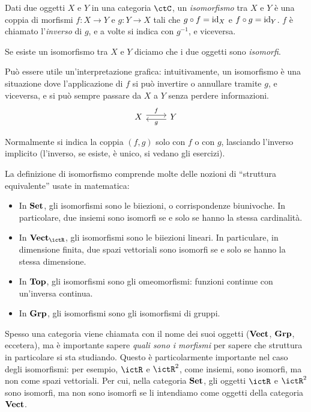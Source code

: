 \begin{definition}
 Dati due oggetti $X$ e $Y$ in una categoria $\ctC$, un \emph{isomorfismo} tra $X$ e $Y$ è una coppia di morfismi $f:X\to Y$ e $g:Y\to X$ tali che $g\circ f=\mathrm{id}_X$ e $f\circ g=\mathrm{id}_Y$. 
 $f$ è chiamato l'\emph{inverso} di $g$, e a volte si indica con $g^{-1}$, e viceversa.
 
 Se esiste un isomorfismo tra $X$ e $Y$ diciamo che i due oggetti sono \emph{isomorfi}.
\end{definition}

Può essere utile un'interpretazione grafica: intuitivamente, un isomorfismo è una situazione dove l'applicazione di $f$ si può invertire o annullare tramite $g$, e viceversa, e si può sempre passare da $X$ a $Y$ senza perdere informazioni. 
\[
\begin{tikzcd}
 X \ar[shift left]{r}{f} & Y \ar[shift left]{l}{g}
\end{tikzcd}
\]

Normalmente si indica la coppia $(f,g)$ solo con $f$ o con $g$, lasciando l'inverso implicito (l'inverso, se esiste, è unico, si vedano gli esercizi).

\begin{examples}
 La definizione di isomorfismo comprende molte delle nozioni di ``struttura equivalente'' usate in matematica:
 \begin{itemize}
  \item In $\mathbf{Set}$, gli isomorfismi sono le biiezioni, o corrispondenze biunivoche. In particolare, due insiemi sono isomorfi se e solo se hanno la stessa cardinalità.
  \item In $\ctVect_\ictR$, gli isomorfismi sono le biiezioni lineari. In particulare, in dimensione finita, due spazi vettoriali sono isomorfi se e solo se hanno la stessa dimensione.
  \item In $\mathbf{Top}$, gli isomorfismi sono gli omeomorfismi: funzioni continue con un'inversa continua. 
  \item In $\mathbf{Grp}$, gli isomorfismi sono gli isomorfismi di gruppi. 
 \end{itemize}
\end{examples}

\begin{warning}
 Spesso una categoria viene chiamata con il nome dei suoi oggetti ($\mathbf{Vect}$, $\mathbf{Grp}$, eccetera), ma è importante sapere \emph{quali sono i morfismi} per sapere che struttura in particolare si sta studiando. Questo è particolarmente importante nel caso degli isomorfismi: per esempio, $\ictR$ e $\ictR^2$, come insiemi, sono isomorfi, ma non come spazi vettoriali. Per cui, nella categoria $\mathbf{Set}$, gli oggetti $\ictR$ e $\ictR^2$ sono isomorfi, ma non sono isomorfi se li intendiamo come oggetti della categoria $\mathbf{Vect}$. 
\end{warning}

